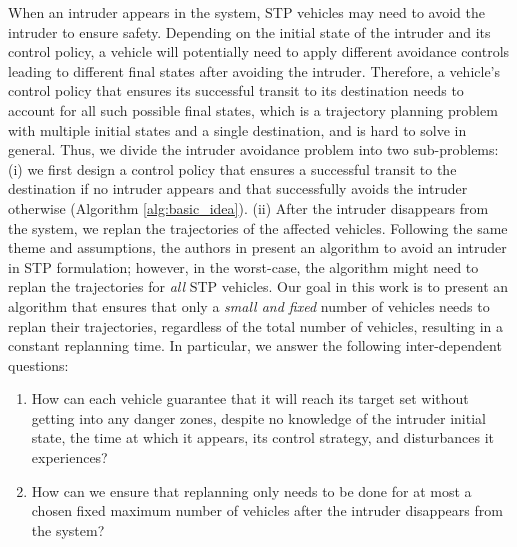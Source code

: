 When an intruder appears in the system, STP vehicles may need to avoid the intruder to ensure safety. Depending on the initial state of the intruder and its control policy, a vehicle will potentially need to apply different avoidance controls leading to different final states after avoiding the intruder. Therefore, a vehicle's control policy that ensures its successful transit to its destination needs to account for all such possible final states, which is a trajectory planning problem with multiple initial states and a single destination, and is hard to solve in general. Thus, we divide the intruder avoidance problem into two sub-problems: (i) we first design a control policy that ensures a successful transit to the destination if no intruder appears and that successfully avoids the intruder otherwise (Algorithm \ref{alg:basic_idea}). (ii) After the intruder disappears from the system, we replan the trajectories of the affected vehicles. Following the same theme and assumptions, the authors in \cite{chen2016robust} present an algorithm to avoid an intruder in STP formulation; however, in the worst-case, the algorithm might need to replan the trajectories for \textit{all} STP vehicles. Our goal in this work is to present an algorithm that ensures that only a \textit{small and fixed} number of vehicles needs to replan their trajectories, regardless of the total number of vehicles, resulting in a constant replanning time. In particular, we answer the following inter-dependent questions:
\begin{enumerate}
\item How can each vehicle guarantee that it will reach its target set without getting into any danger zones, despite no knowledge of the intruder initial state, the time at which it appears, its control strategy, and disturbances it experiences?
\item How can we ensure that replanning only needs to be done for at most a chosen fixed maximum number of vehicles after the intruder disappears from the system? \label{question2}
\end{enumerate}

